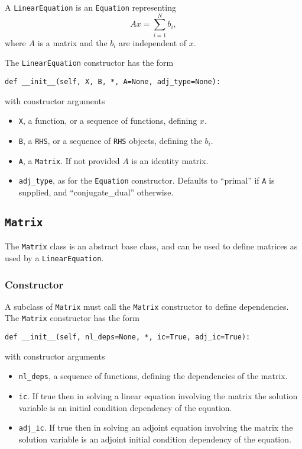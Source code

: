 \documentclass[11pt]{article}
\begin{document}
A \texttt{LinearEquation} is an \texttt{Equation} representing
\begin{equation*}
  A x = \sum_{i = 1}^N b_i,
\end{equation*}
where $A$ is a matrix and the $b_i$ are independent of $x$.

The \texttt{LinearEquation} constructor has the form
\begin{lstlisting}
def __init__(self, X, B, *, A=None, adj_type=None):
\end{lstlisting}
with constructor arguments
\begin{itemize}
  \item \texttt{X}, a function, or a sequence of functions, defining $x$.
  \item \texttt{B}, a \texttt{RHS}, or a sequence of \texttt{RHS} objects,
    defining the $b_i$.
  \item \texttt{A}, a \texttt{Matrix}. If not provided $A$ is an identity
    matrix.
  \item \texttt{adj\_type}, as for the \texttt{Equation} constructor. Defaults
    to ``primal'' if \texttt{A} is supplied, and ``conjugate\_dual'' otherwise.
\end{itemize}

\subsection{\texttt{Matrix}}

The \texttt{Matrix} class is an abstract base class, and can be used to define
matrices as used by a \texttt{LinearEquation}.

\subsubsection{Constructor}

A subclass of \texttt{Matrix} must call the \texttt{Matrix} constructor to
define dependencies. The \texttt{Matrix} constructor has the form
\begin{lstlisting}
def __init__(self, nl_deps=None, *, ic=True, adj_ic=True):
\end{lstlisting}
with constructor arguments
\begin{itemize}
  \item \texttt{nl\_deps}, a sequence of functions, defining the dependencies
    of the matrix.
  \item \texttt{ic}. If true then in solving a linear equation involving the
    matrix the solution variable is an initial condition dependency of the
    equation.
  \item \texttt{adj\_ic}. If true then in solving an adjoint equation
    involving the matrix the solution variable is an adjoint initial
    condition dependency of the equation.
\end{itemize}
\end{document}
